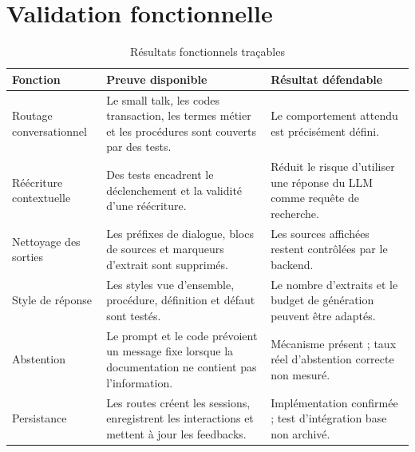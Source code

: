 \section{Validation fonctionnelle}
\begin{table}[H]
\centering
\caption{Résultats fonctionnels traçables}
\label{tab:functional_results_ch7}
\begin{tabular}{p{3.3cm}p{5.0cm}p{5.3cm}}
\toprule
\textbf{Fonction} & \textbf{Preuve disponible} & \textbf{Résultat défendable} \\
\midrule
Routage conversationnel & Le small talk, les codes transaction, les termes métier et les procédures sont couverts par des tests. & Le comportement attendu est précisément défini. \\
Réécriture contextuelle & Des tests encadrent le déclenchement et la validité d’une réécriture. & Réduit le risque d’utiliser une réponse du LLM comme requête de recherche. \\
Nettoyage des sorties & Les préfixes de dialogue, blocs de sources et marqueurs d’extrait sont supprimés. & Les sources affichées restent contrôlées par le backend. \\
Style de réponse & Les styles vue d’ensemble, procédure, définition et défaut sont testés. & Le nombre d’extraits et le budget de génération peuvent être adaptés. \\
Abstention & Le prompt et le code prévoient un message fixe lorsque la documentation ne contient pas l’information. & Mécanisme présent ; taux réel d’abstention correcte non mesuré. \\
Persistance & Les routes créent les sessions, enregistrent les interactions et mettent à jour les feedbacks. & Implémentation confirmée ; test d’intégration base non archivé. \\
\bottomrule
\end{tabular}
\end{table}
